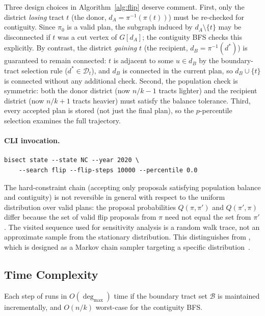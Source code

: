 Three design choices in Algorithm~\ref{alg:flip} deserve comment.
First, only the district \emph{losing} tract $t$ (the donor, $d_A =
\pi^{-1}(\pi(t))$) must be re-checked for contiguity.
Since $\pi_0$ is a valid plan, the subgraph induced by $d_A \setminus
\{t\}$ may be disconnected if $t$ was a cut vertex of $G[d_A]$; the
contiguity BFS checks this explicitly.
By contrast, the district \emph{gaining} $t$ (the recipient, $d_B =
\pi^{-1}(d^*)$) is guaranteed to remain connected: $t$ is adjacent to
some $u \in d_B$ by the boundary-tract selection rule
($d^* \in \mathcal{D}_t$), and $d_B$ is connected in the current plan,
so $d_B \cup \{t\}$ is connected without any additional check.
Second, the population check is symmetric: both the donor district (now
$n/k - 1$ tracts lighter) and the recipient district (now $n/k + 1$ tracts
heavier) must satisfy the balance tolerance.
Third, every accepted plan is stored (not just the final plan), so the
$p$-percentile selection examines the full trajectory.

\paragraph{CLI invocation.}
\begin{verbatim}
bisect state --state NC --year 2020 \
    --search flip --flip-steps 10000 --percentile 0.0
\end{verbatim}

\begin{remark}
\label{rem:target-dist}
The hard-constraint \flip{} chain (accepting only proposals satisfying
population balance and contiguity) is not reversible in general with
respect to the uniform distribution over valid plans: the proposal
probabilities $Q(\pi, \pi')$ and $Q(\pi', \pi)$ differ because the set
of valid flip proposals from $\pi$ need not equal the set from $\pi'$.
The visited sequence used for sensitivity analysis is a random walk
trace, not an approximate sample from the stationary distribution.
This distinguishes \flip{} from \recom{}, which is designed as a Markov
chain sampler targeting a specific distribution~\citep{deford2021}.
\end{remark}

\subsection{Time Complexity}

\begin{proposition}
\label{prop:o1}
Each step of \flip{} runs in $O(\deg_{\max})$ time if the boundary tract
set $\mathcal{B}$ is maintained incrementally, and $O(n/k)$ worst-case for
the contiguity BFS.
\end{proposition}

